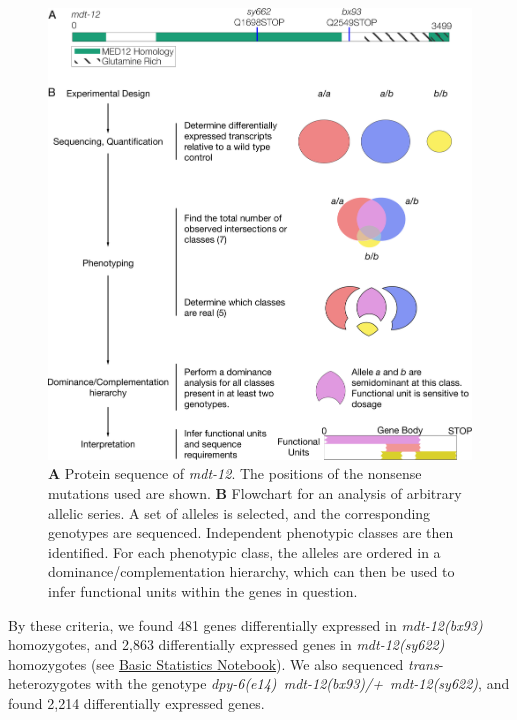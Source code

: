 \documentclass[8pt, twocolumn]{article}
\newcommand{\gene}[1]{\mbox{\emph{#1}}}
\newcommand{\dpy}[1]{\gene{mdt-12#1}}
\newcommand{\strongn}{2,863}
\newcommand{\weakn}{481}
\newcommand{\transn}{2,214}
\newcommand{\bx}{\dpy{(bx93)}}
\newcommand{\sy}{\dpy{(sy622)}}
\begin{document}
\begin{figure}
  \centering{}
  \includegraphics[width=\textwidth]{../../figs/Flowchart_Conceptual.pdf}
  \caption{
  \textbf{A} Protein sequence of \dpy{}. The positions of the nonsense
  mutations used are shown.
  \textbf{B} Flowchart for an analysis of arbitrary allelic series. A set of
  alleles is selected, and the corresponding genotypes are sequenced.
  Independent phenotypic classes are then identified. For each phenotypic class,
  the alleles are ordered in a dominance/complementation hierarchy, which can
  then be used to infer functional units within the genes in question.}
\label{fig:flowchart}
\end{figure}

By these criteria, we found \weakn{} genes differentially expressed in
\bx{} homozygotes, and \strongn{} differentially expressed genes in
\sy{} homozygotes (see
\href{https://wormlabcaltech.github.io/med-cafe/notebook/basic.html}{Basic
Statistics Notebook}). We also sequenced \emph{trans}-heterozygotes with the
genotype \gene{dpy-6(e14) mdt-12(bx93)/+ mdt-12(sy622)}, and found \transn{}
differentially expressed genes.
\end{document}

